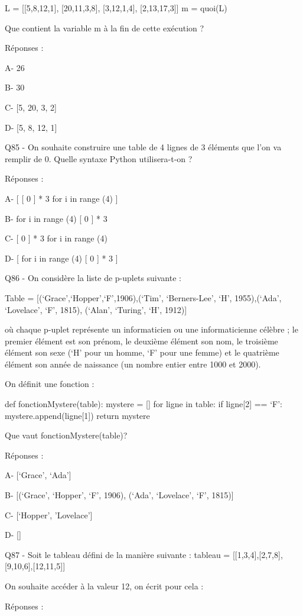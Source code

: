 \documentclass[
]{book}
\begin{document}
L = {[}{[}5,8,12,1{]}, {[}20,11,3,8{]}, {[}3,12,1,4{]}, {[}2,13,17,3{]}{]}
m = quoi(L)

Que contient la variable m à la fin de cette exécution ?

Réponses :

A- 26

B- 30

C- {[}5, 20, 3, 2{]}

D- {[}5, 8, 12, 1{]}

Q85 - On souhaite construire une table de 4 lignes de 3 éléments que l'on va remplir de 0. Quelle syntaxe Python utilisera-t-on ?

Réponses :

A- {[} {[} 0 {]} * 3 for i in range (4) {]}

B- for i in range (4) {[} 0 {]} * 3

C- {[} 0 {]} * 3 for i in range (4)

D- {[} for i in range (4) {[} 0 {]} * 3 {]}

Q86 - On considère la liste de p-uplets suivante :

Table = {[}(`Grace',`Hopper',`F',1906),(`Tim', `Berners-Lee', `H', 1955),(`Ada', `Lovelace', `F', 1815), (`Alan', `Turing', `H', 1912){]}

où chaque p-uplet représente un informaticien ou une informaticienne célèbre ; le premier élément est son prénom, le deuxième élément son nom, le troisième élément son sexe (`H' pour un homme, `F' pour une femme) et le quatrième élément son année de naissance (un nombre entier entre 1000 et 2000).

On définit une fonction :

def fonctionMystere(table):
mystere = {[}{]}
for ligne in table:
if ligne{[}2{]} == `F':
mystere.append(ligne{[}1{]})
return mystere

Que vaut fonctionMystere(table)?

Réponses :

A- {[}`Grace', `Ada'{]}

B- {[}(`Grace', `Hopper', `F', 1906), (`Ada', `Lovelace', `F', 1815){]}

C- {[}`Hopper', 'Lovelace'{]}

D- {[}{]}

Q87 - Soit le tableau défini de la manière suivante : tableau = {[}{[}1,3,4{]},{[}2,7,8{]},{[}9,10,6{]},{[}12,11,5{]}{]}

On souhaite accéder à la valeur 12, on écrit pour cela :

Réponses :
\end{document}
